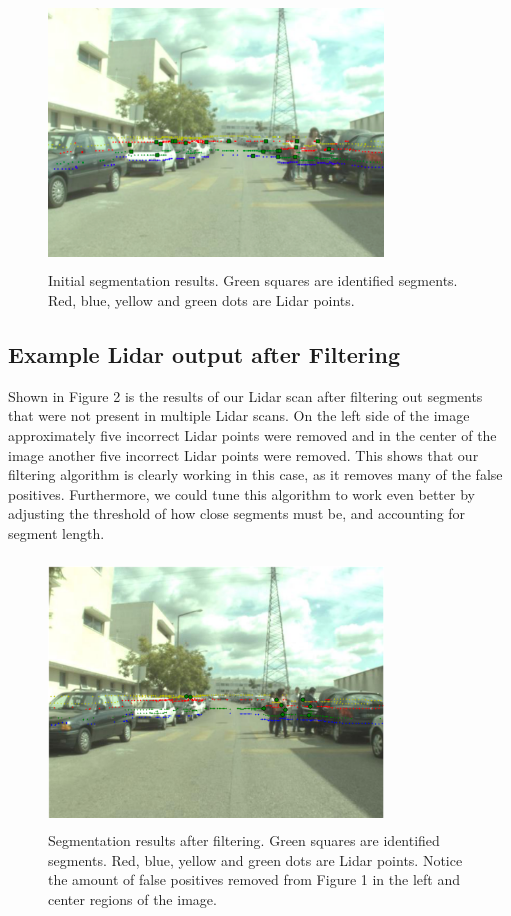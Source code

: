 \documentclass[10pt,twocolumn,letterpaper]{article}
\begin{document}
  \begin{figure}
    \includegraphics[height=2.8in, width=3.5in]{images/initial_result.png}
    \caption{ Initial segmentation results. Green squares are identified
    segments. Red, blue, yellow and green dots are Lidar points.}
  \end{figure}


  \subsection{Example Lidar output after Filtering}  
  Shown in Figure 2 is the results of our Lidar scan after filtering out segments
  that were not present in multiple Lidar scans. On the left side of the image 
  approximately five incorrect Lidar points were removed and in the center of 
  the image another five incorrect Lidar points were removed. This shows that 
  our filtering algorithm is clearly working in this case, as it removes many
  of the false positives. Furthermore, we could tune this algorithm to work
  even better by adjusting the threshold of how close segments must be, and 
  accounting for segment length. 

  \begin{figure}
    \includegraphics[height=2.8in, width=3.5in]{images/filterSampleResults.png}
    \caption{ Segmentation results after filtering. Green squares are identified
    segments. Red, blue, yellow and green dots are Lidar points. Notice the 
    amount of false positives removed from Figure 1 in the left and center
    regions of the image.}
  \end{figure}
\end{document}
